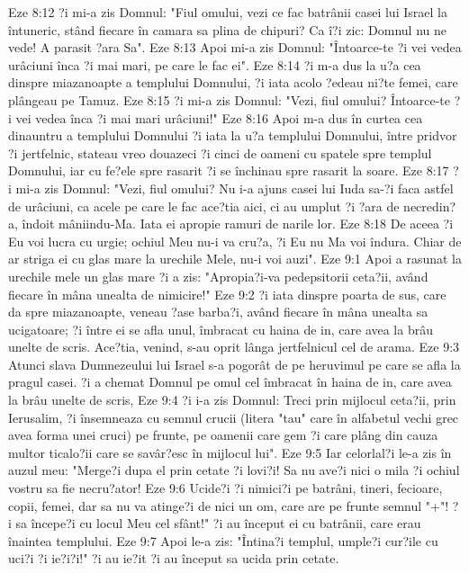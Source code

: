 Eze 8:12  ?i mi-a zis Domnul: "Fiul omului, vezi ce fac batrânii casei lui Israel la întuneric, stând fiecare în camara sa plina de chipuri? Ca î?i zic: Domnul nu ne vede! A parasit ?ara Sa".
Eze 8:13  Apoi mi-a zis Domnul: "Întoarce-te ?i vei vedea urâciuni înca ?i mai mari, pe care le fac ei".
Eze 8:14  ?i m-a dus la u?a cea dinspre miazanoapte a templului Domnului, ?i iata acolo ?edeau ni?te femei, care plângeau pe Tamuz.
Eze 8:15  ?i mi-a zis Domnul: "Vezi, fiul omului? Întoarce-te ?i vei vedea înca ?i mai mari urâciuni!"
Eze 8:16  Apoi m-a dus în curtea cea dinauntru a templului Domnului ?i iata la u?a templului Domnului, între pridvor ?i jertfelnic, stateau vreo douazeci ?i cinci de oameni cu spatele spre templul Domnului, iar cu fe?ele spre rasarit ?i se închinau spre rasarit la soare.
Eze 8:17  ?i mi-a zis Domnul: "Vezi, fiul omului? Nu i-a ajuns casei lui Iuda sa-?i faca astfel de urâciuni, ca acele pe care le fac ace?tia aici, ci au umplut ?i ?ara de necredin?a, îndoit mâniindu-Ma. Iata ei apropie ramuri de narile lor.
Eze 8:18  De aceea ?i Eu voi lucra cu urgie; ochiul Meu nu-i va cru?a, ?i Eu nu Ma voi îndura. Chiar de ar striga ei cu glas mare la urechile Mele, nu-i voi auzi".
Eze 9:1  Apoi a rasunat la urechile mele un glas mare ?i a zis: "Apropia?i-va pedepsitorii ceta?ii, având fiecare în mâna unealta de nimicire!"
Eze 9:2  ?i iata dinspre poarta de sus, care da spre miazanoapte, veneau ?ase barba?i, având fiecare în mâna unealta sa ucigatoare; ?i între ei se afla unul, îmbracat cu haina de in, care avea la brâu unelte de scris. Ace?tia, venind, s-au oprit lânga jertfelnicul cel de arama.
Eze 9:3  Atunci slava Dumnezeului lui Israel s-a pogorât de pe heruvimul pe care se afla la pragul casei. ?i a chemat Domnul pe omul cel îmbracat în haina de in, care avea la brâu unelte de scris,
Eze 9:4  ?i i-a zis Domnul: Treci prin mijlocul ceta?ii, prin Ierusalim, ?i însemneaza cu semnul crucii (litera "tau" care în alfabetul vechi grec avea forma unei cruci) pe frunte, pe oamenii care gem ?i care plâng din cauza multor ticalo?ii care se savâr?esc în mijlocul lui".
Eze 9:5  Iar celorlal?i le-a zis în auzul meu: "Merge?i dupa el prin cetate ?i lovi?i! Sa nu ave?i nici o mila ?i ochiul vostru sa fie necru?ator!
Eze 9:6  Ucide?i ?i nimici?i pe batrâni, tineri, fecioare, copii, femei, dar sa nu va atinge?i de nici un om, care are pe frunte semnul "+"! ?i sa începe?i cu locul Meu cel sfânt!" ?i au început ei cu batrânii, care erau înaintea templului.
Eze 9:7  Apoi le-a zis: "Întina?i templul, umple?i cur?ile cu uci?i ?i ie?i?i!" ?i au ie?it ?i au început sa ucida prin cetate.
